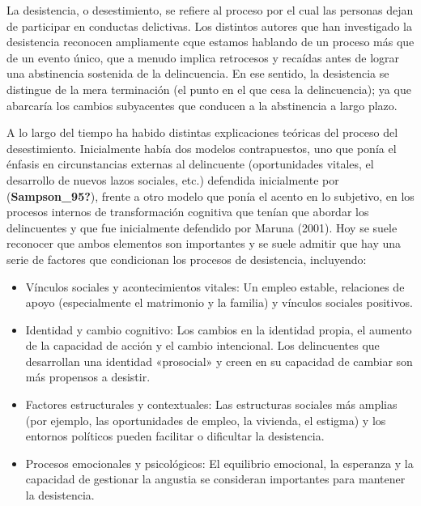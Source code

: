 \documentclass[
  spanish,
  letterpaper,
  DIV=11,
  numbers=noendperiod]{scrreprt}
\begin{document}
La desistencia, o desestimiento, se refiere al proceso por el cual las
personas dejan de participar en conductas delictivas. Los distintos
autores que han investigado la desistencia reconocen ampliamente cque
estamos hablando de un proceso más que de un evento único, que a menudo
implica retrocesos y recaídas antes de lograr una abstinencia sostenida
de la delincuencia. En ese sentido, la desistencia se distingue de la
mera terminación (el punto en el que cesa la delincuencia); ya que
abarcaría los cambios subyacentes que conducen a la abstinencia a largo
plazo.

A lo largo del tiempo ha habido distintas explicaciones teóricas del
proceso del desestimiento. Inicialmente había dos modelos contrapuestos,
uno que ponía el énfasis en circunstancias externas al delincuente
(oportunidades vitales, el desarrollo de nuevos lazos sociales, etc.)
defendida inicialmente por (\textbf{Sampson\_95?}), frente a otro modelo
que ponía el acento en lo subjetivo, en los procesos internos de
transformación cognitiva que tenían que abordar los delincuentes y que
fue inicialmente defendido por Maruna (2001). Hoy se suele reconocer que
ambos elementos son importantes y se suele admitir que hay una serie de
factores que condicionan los procesos de desistencia, incluyendo:

\begin{itemize}
\item
  Vínculos sociales y acontecimientos vitales: Un empleo estable,
  relaciones de apoyo (especialmente el matrimonio y la familia) y
  vínculos sociales positivos.
\item
  Identidad y cambio cognitivo: Los cambios en la identidad propia, el
  aumento de la capacidad de acción y el cambio intencional. Los
  delincuentes que desarrollan una identidad «prosocial» y creen en su
  capacidad de cambiar son más propensos a desistir.
\item
  Factores estructurales y contextuales: Las estructuras sociales más
  amplias (por ejemplo, las oportunidades de empleo, la vivienda, el
  estigma) y los entornos políticos pueden facilitar o dificultar la
  desistencia.
\item
  Procesos emocionales y psicológicos: El equilibrio emocional, la
  esperanza y la capacidad de gestionar la angustia se consideran
  importantes para mantener la desistencia.
\end{itemize}
\end{document}
